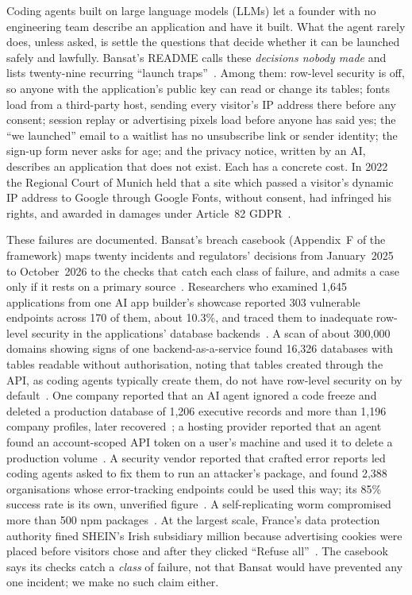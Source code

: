 \documentclass[11pt,a4paper]{article}
\begin{document}
Coding agents built on large language models (LLMs) let a founder with no engineering team describe an application and
have it built. What the agent rarely does, unless asked, is settle the questions that decide whether it can be launched
safely and lawfully. Bansat's README calls these \emph{decisions nobody
made} and lists twenty-nine recurring ``launch traps''~\cite{khan2026bansat}. Among them: row-level security is off, so
anyone with the application's public key can read or change its tables; fonts load from a third-party host, sending
every visitor's IP address there before any consent; session replay or advertising pixels load before anyone has said
yes; the ``we launched'' email to a waitlist has no unsubscribe link or sender identity; the sign-up form never asks for
age; and the privacy notice, written by an AI, describes an application that does not exist. Each has a concrete cost.
In 2022 the Regional Court of Munich held that a site which passed a visitor's dynamic IP address to Google through
Google Fonts, without consent, had infringed his rights, and awarded  in damages under Article~82
GDPR~\cite{lgmuenchen2022fonts}.

These failures are documented. Bansat's breach casebook (Appendix~F of the framework) maps twenty incidents and
regulators' decisions from January~2025 to October~2026 to the checks that catch each class of failure, and admits a
case only if it rests on a primary source~\cite{khan2026bansat}. Researchers who examined 1,645 applications from one
AI app builder's showcase reported 303 vulnerable endpoints across 170 of them, about 10.3\%, and traced them to
inadequate row-level security in the applications' database backends~\cite{palmer2025statement}. A scan of about
300,000 domains showing signs of one backend-as-a-service found 16,326 databases with tables readable without
authorisation, noting that tables created through the API, as coding agents typically create them, do not have
row-level security on by default~\cite{upguard2026supabase}. One company reported that an AI agent ignored a code freeze and deleted a production database of 1,206 executive
records and more than 1,196 company profiles, later recovered~\cite{saastr2025replit}; a hosting provider reported that an agent found an account-scoped API token on a
user's machine and used it to delete a production volume~\cite{railway2026nuke}. A security vendor reported that crafted
error reports led coding agents asked to fix them to run an attacker's package, and found 2,388 organisations whose
error-tracking endpoints could be used this way; its 85\% success rate is its own, unverified
figure~\cite{tenet2026agentjacking}. A self-replicating worm compromised more than 500 npm packages~\cite{cisa2025npm}. At the largest scale, France's data protection authority fined SHEIN's Irish
subsidiary  million because advertising cookies were placed before visitors chose and after they clicked
``Refuse all''~\cite{cnil2025shein}.
The casebook says its checks catch a \emph{class} of failure, not that Bansat would have prevented any one incident;
we make no such claim either.
\end{document}
